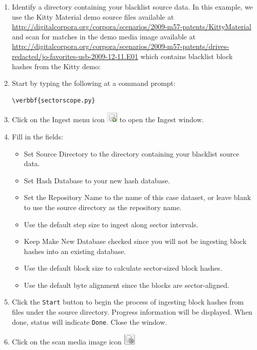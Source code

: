 \documentclass[11pt,fleqn]{article} %
\begin{document}
\begin{enumerate}
\item Identify a directory containing your blacklist source data.
In this example, we use the Kitty Material demo source files available at \url{http://digitalcorpora.org/corpora/scenarios/2009-m57-patents/KittyMaterial} and scan for matches in the demo media image available at \url{http://digitalcorpora.org/corpora/scenarios/2009-m57-patents/drives-redacted/jo-favorites-usb-2009-12-11.E01} which contains blacklist block hashes from the Kitty demo:
\item Start \sscope by typing the following at a command prompt:
\begin{Verbatim}[commandchars=\\\{\}]
\verbbf{sectorscope.py}
\end{Verbatim} 
\item Click on the Ingest menu icon 
\includegraphics[scale=.4]{screenshots/ingest_menu_icon}
to open the \sscope Ingest window.
\item Fill in the fields:
  \begin{itemize}
  \item Set Source Directory to the directory containing your blacklist source data.
  \item Set Hash Database to your new hash database.
  \item Set the Repository Name to the name of this case dataset, or leave blank to use the source directory as the repository name.
  \item Use the default step size to ingest along sector intervals.
  \item Keep Make New Database checked since you will not be ingesting block hashes into an existing database.
  \item Use the default block size to calculate sector-sized block hashes.
  \item Use the default byte alignment since the blocks are sector-aligned.
  \end{itemize}
\item Click the \verb+Start+ button to begin the process of ingesting block hashes from files under the source directory. Progress information will be displayed. When done, status will indicate \verb+Done+. Close the window.
\item Click on the scan media image icon
\includegraphics[scale=.4]{screenshots/scan_media_image_icon}

\end{enumerate}
\end{document}
